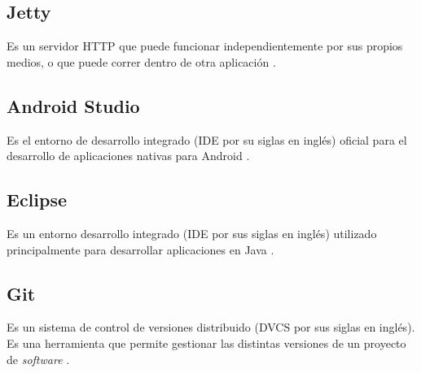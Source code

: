 \subsection{Jetty}
Es un servidor HTTP que puede funcionar independientemente por sus propios medios, o que puede correr dentro de otra aplicación \cite{JTY1}.

\subsection{Android Studio}
Es el entorno de desarrollo integrado (IDE por su siglas en inglés) oficial para el desarrollo de aplicaciones nativas para Android \cite{ASD1}.

\subsection{Eclipse}
Es un entorno desarrollo integrado (IDE por sus siglas en inglés) utilizado principalmente para desarrollar aplicaciones en Java \cite{ECL1}.

\subsection{Git}
Es un sistema de control de versiones distribuido (DVCS por sus siglas en inglés). Es una herramienta que permite gestionar las distintas versiones de un proyecto de \textit{software} \cite{GIT1}.
